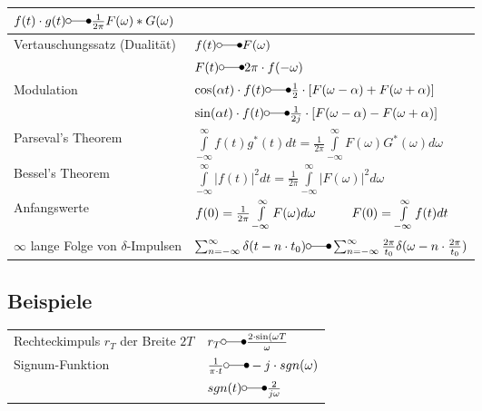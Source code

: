 \begin{tabular}{|p{8cm}|p{8cm}|}
			$f(t) \cdot g(t) \laplace \frac{1}{2\pi}F(\omega) \ast G(\omega)$\\
			\hline
			Vertauschungssatz (Dualität) &
			$f(t) \laplace F(\omega)\nonumber$ \\
 			& $F(t) \laplace 2\pi \cdot f(-\omega)$\\
 			\hline
 			Modulation &
 			$\cos(\alpha t) \cdot f(t)  \laplace  \frac{1}{2}\cdot
 			\left[F(\omega-\alpha) + F(\omega+\alpha)\right ]$\\
 			& $\sin(\alpha t) \cdot f(t) \laplace \frac{1}{2j}\cdot \left[
 			F(\omega-\alpha) - F(\omega+\alpha)\right ]$\\
 			\hline
        	Parseval's Theorem &
 			$\int\limits_{-\infty}^{\infty}f(t)g^{\ast}(t)dt = \frac{1}{2\pi}
  			\int\limits_{-\infty}^{\infty}F(\omega)G^{\ast}(\omega)d\omega$\\
  			\hline
  			Bessel's Theorem &
  			$\int\limits_{-\infty}^{\infty}|f(t)|^2 dt = \frac{1}{2\pi}
  			\int\limits_{-\infty}^{\infty}|F(\omega)|^2 d\omega$\\
  			\hline 			
			Anfangswerte &
			$f(0)=\frac{1}{2\pi}\int\limits_{-\infty}^{\infty}F(\omega)d\omega
			\hspace*{1cm} F(0)=\int\limits_{-\infty}^{\infty}f(t)dt$\\
			\hline
			$\infty$ lange Folge von $\delta$-Impulsen &
			$\sum_{n=-\infty}^{\infty} \delta(t-n\cdot t_0) \laplace
			\sum_{n=-\infty}^{\infty} \frac{2\pi}{t_0}\delta(\omega-n\cdot
			\frac{2\pi}{t_0})$\\
			\hline
        \end{tabular}
        
\subsection{Beispiele}
\begin{tabular}{l l}
Rechteckimpuls $r_T$ der Breite $2T$ & $r_T \laplace \frac{2 \cdot \sin(\omega T}{\omega}$ \\
Signum-Funktion & $\frac{1}{\pi \cdot t} \laplace -j \cdot sgn(\omega)$ \\
				& $sgn(t) \laplace \frac{2}{j\omega}$ \\
\end{tabular}


